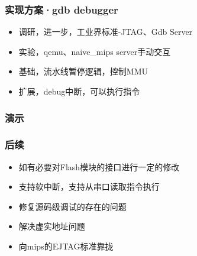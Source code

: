 ﻿\documentclass[11pt]{beamer}
\begin{document}
\begin{frame}
\frametitle{实现方案·gdb debugger}
\begin{itemize}
\item 调研，进一步，工业界标准-JTAG、Gdb Server
\item 实验，qemu、naive\_mips server手动交互
\item 基础，流水线暂停逻辑，控制MMU
\item 扩展，debug中断，可以执行指令
\end{itemize}
\end{frame}

\begin{frame}
\frametitle{演示}
\end{frame}

\begin{frame}
\frametitle{后续}
\begin{itemize}
\item 如有必要对Flash模块的接口进行一定的修改
\item 支持软中断，支持从串口读取指令执行
\item 修复源码级调试的存在的问题
\item 解决虚实地址问题
\item 向mips的EJTAG标准靠拢
\end{itemize}
\end{frame}
\end{document}
